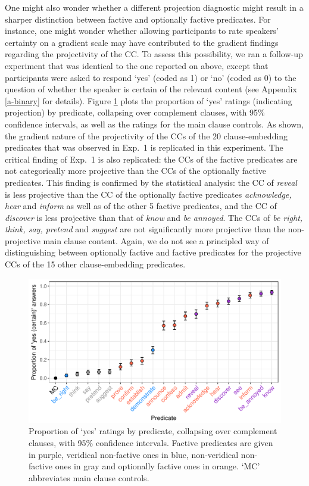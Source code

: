 \documentclass[11pt,fleqn]{article}
\newcommand{\6}{\mbox{$[\hspace*{-.6mm}[$}}
\newcommand{\9}{\mbox{$]\hspace*{-.6mm}]$}}
\begin{document}
One might also wonder whether a different projection diagnostic might result in a sharper distinction between factive and optionally factive predicates. For instance, one might wonder whether allowing participants to rate speakers' certainty on a gradient scale may have contributed to the gradient findings regarding the projectivity of the CC. To assess this possibility, we ran a follow-up experiment that was identical to the one reported on above, except that participants were asked to respond `yes' (coded as 1) or `no' (coded as 0) to the question of whether the speaker is certain of the relevant content (see Appendix \ref{a-binary} for details). Figure \ref{f-projectivity2} plots the proportion of `yes' ratings (indicating projection) by predicate, collapsing over complement clauses, with 95\% confidence intervals, as well as the ratings for the main clause controls. As shown, the gradient nature of the projectivity of the CCs of the 20 clause-embedding predicates that was observed in Exp.~1 is replicated in this experiment. The critical finding of Exp.~1 is also replicated: the CCs of the factive predicates are not categorically more projective than the CCs of the optionally factive predicates. This finding is confirmed by the statistical analysis: the CC of {\em reveal} is less projective than the CC of the optionally factive predicates {\em acknowledge, hear} and {\em inform} as well as of the other 5 factive predicates, and the CC of {\em discover} is less projective than that of {\em know} and {\em be annoyed}. The CCs of {\em be right, think, say, pretend} and {\em suggest} are not significantly more projective than the non-projective main clause content. Again, we do not see a principled way of distinguishing between optionally factive and factive predicates for the projective CCs of the 15 other clause-embedding predicates. 

\begin{figure}[H]

\centering
\includegraphics[width=.7\paperwidth]{../results/8-projectivity-no-fact-binary/graphs/proportion-by-predicate-variability}
\caption{Proportion of `yes' ratings by predicate, collapsing over complement clauses, with 95\% confidence intervals. Factive predicates are given in purple, veridical non-factive ones in blue, non-veridical non-factive ones in gray and optionally factive ones in orange. `MC' abbreviates main clause controls.}\label{f-projectivity2}

\end{figure}
\end{document}
